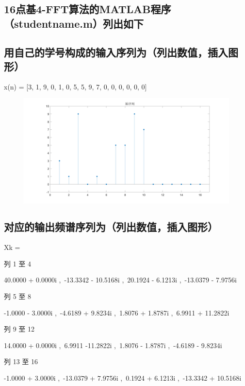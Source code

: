\documentclass{../source/Experiment}
\begin{document}
        \subsection{16点基4-FFT算法的MATLAB程序（studentname.m）列出如下}
        
        \subsection{用自己的学号构成的输入序列为（列出数值，插入图形）}
        x(n) = [3, 1, 9, 0, 1, 0, 5, 5, 9, 7, 0, 0, 0, 0, 0, 0]
        \begin{figure}[H]
            \centering
            \includegraphics[width = 1.0\textwidth]{src/exp3_1.png}
        \end{figure}
        \subsection{对应的输出频谱序列为（列出数值，插入图形）}
        Xk =

        列 1 至 4

        40.0000 + 0.0000i ,\, -13.3342 - 10.5168i ,\, 20.1924 - 6.1213i ,\, -13.0379 - 7.9756i

        列 5 至 8

        -1.0000 - 3.0000i ,\, -4.6189 + 9.8234i ,\, 1.8076 + 1.8787i ,\, 6.9911 + 11.2822i

        列 9 至 12

        14.0000 + 0.0000i ,\, 6.9911 -11.2822i ,\, 1.8076 - 1.8787i ,\, -4.6189 - 9.8234i

        列 13 至 16

        -1.0000 + 3.0000i ,\, -13.0379 + 7.9756i ,\, 0.1924 + 6.1213i ,\, -13.3342 + 10.5168i
\end{document}
